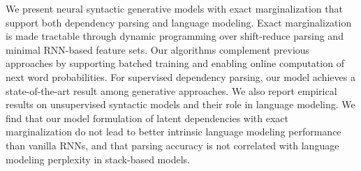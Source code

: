 We present neural syntactic generative models with exact marginalization that support both dependency parsing and language modeling. Exact marginalization is made tractable through dynamic programming over shift-reduce parsing and minimal RNN-based feature sets. Our algorithms complement previous approaches by supporting batched training and enabling online computation of next word probabilities. For supervised dependency parsing, our model achieves a state-of-the-art result among generative approaches. We also report empirical results on unsupervised syntactic models and their role in language modeling. We find that our model formulation of latent dependencies with exact marginalization do not lead to better intrinsic language modeling performance than vanilla RNNs, and that parsing accuracy is not correlated with language modeling perplexity in stack-based models.
